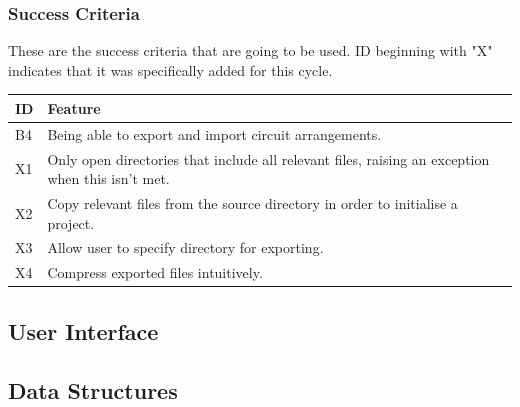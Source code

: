 \documentclass[tikz, 11pt]{article}
\begin{document}
            \subsubsection{Success Criteria}
                These are the success criteria that are going to be used. ID beginning with "X" indicates that it was specifically added for this cycle.
                \begin{table}[!ht]
                    \begin{center}
                    \begin{tabular}{m{16pt}m{}}
                    ID & Feature \\ \hline
                    B4 & Being able to export and import circuit arrangements. \\ 
                    X1 & Only open directories that include all relevant files, raising an exception when this isn't met. \\ 
                    X2 & Copy relevant files from the source directory in order to initialise a project. \\ 
                    X3 & Allow user to specify directory for exporting. \\ 
                    X4 & Compress exported files intuitively. \\ 
                    \end{tabular}
                \end{center}
                    
                \end{table}
        \subsection{User Interface}

        \subsection{Data Structures}
\end{document}
